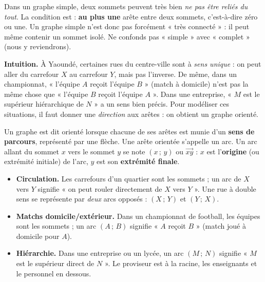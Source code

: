 \documentclass[11pt]{article}
\newcommand{\cle}[1]{{\popxbold\color{popdark}#1}}
\newcounter{popsec}
\newcounter{popsub}
\newcommand{\courssub}[1]{%
  \stepcounter{popsub}%
  \par\vspace{9pt}\noindent{\popxbold\fontsize{11.5}{13}\selectfont\color{popink}{\color{poporange}\thepopsec.\thepopsub}\hspace{6pt}#1}\par\nopagebreak\vspace{4pt}
}
\begin{document}
\begin{attention}
Dans un graphe simple, deux sommets peuvent très bien \emph{ne pas être reliés du tout}. La condition est : \textbf{au plus une} arête entre deux sommets, c'est-à-dire zéro ou une. Un graphe simple n'est donc pas forcément « très connecté » : il peut même contenir un sommet isolé. Ne confonds pas « simple » avec « complet » (nous y reviendrons).
\end{attention}

\courssub{Graphes orientés}

\textbf{Intuition.} À Yaoundé, certaines rues du centre-ville sont à \emph{sens unique} : on peut aller du carrefour $X$ au carrefour $Y$, mais pas l'inverse. De même, dans un championnat, « l'équipe $A$ reçoit l'équipe $B$ » (match à domicile) n'est pas la même chose que « l'équipe $B$ reçoit l'équipe $A$ ». Dans une entreprise, « $M$ est le supérieur hiérarchique de $N$ » a un sens bien précis. Pour modéliser ces situations, il faut donner une \emph{direction} aux arêtes : on obtient un graphe orienté.

\begin{definition}
Un graphe est dit \cle{orienté} lorsque chacune de ses arêtes est munie d'un \textbf{sens de parcours}, représenté par une flèche. Une arête orientée s'appelle un \cle{arc}. Un arc allant du sommet $x$ vers le sommet $y$ se note $(x\,;\,y)$ ou $\overrightarrow{xy}$ : $x$ est l'\textbf{origine} (ou extrémité initiale) de l'arc, $y$ est son \textbf{extrémité finale}.
\end{definition}

\begin{exemplebox}
\begin{itemize}
\item \textbf{Circulation.} Les carrefours d'un quartier sont les sommets ; un arc de $X$ vers $Y$ signifie « on peut rouler directement de $X$ vers $Y$ ». Une rue à double sens se représente par \emph{deux} arcs opposés : $(X\,;\,Y)$ et $(Y\,;\,X)$.
\item \textbf{Matchs domicile/extérieur.} Dans un championnat de football, les équipes sont les sommets ; un arc $(A\,;\,B)$ signifie « $A$ reçoit $B$ » (match joué à domicile pour $A$).
\item \textbf{Hiérarchie.} Dans une entreprise ou un lycée, un arc $(M\,;\,N)$ signifie « $M$ est le supérieur direct de $N$ ». Le proviseur est à la racine, les enseignants et le personnel en dessous.
\end{itemize}
\end{exemplebox}
\end{document}
